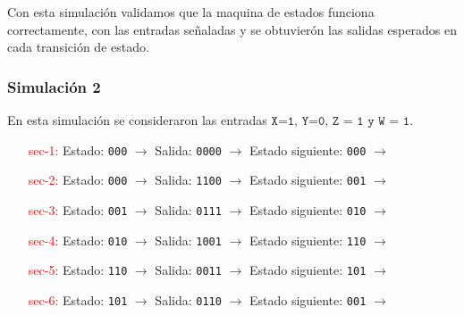\documentclass[12pt, letterpaper]{article}
\begin{document}
Con esta simulación validamos que la maquina de estados funciona correctamente, con las entradas señaladas y se obtuvierón las salidas esperados en cada transición de estado.

\subsubsection*{Simulación 2}

En esta simulación se consideraron las entradas \(\texttt{X=1, Y=0, Z = 1 y W = 1}\).


\begin{enumerate}
    \item[\textcolor{red}{sec-1:}] Estado: \texttt{000} \(\rightarrow\) Salida: \texttt{0000} \(\rightarrow\) Estado siguiente: \texttt{000} \(\rightarrow\)
    \item[\textcolor{red}{sec-2:}] Estado: \texttt{000} \(\rightarrow\) Salida: \texttt{1100} \(\rightarrow\) Estado siguiente: \texttt{001} \(\rightarrow\)
    \item[\textcolor{red}{sec-3:}] Estado: \texttt{001} \(\rightarrow\) Salida: \texttt{0111} \(\rightarrow\) Estado siguiente: \texttt{010} \(\rightarrow\)
    \item[\textcolor{red}{sec-4:}] Estado: \texttt{010} \(\rightarrow\) Salida: \texttt{1001} \(\rightarrow\) Estado siguiente: \texttt{110} \(\rightarrow\)
    \item[\textcolor{red}{sec-5:}] Estado: \texttt{110} \(\rightarrow\) Salida: \texttt{0011} \(\rightarrow\) Estado siguiente: \texttt{101} \(\rightarrow\)
    \item[\textcolor{red}{sec-6:}] Estado: \texttt{101} \(\rightarrow\) Salida: \texttt{0110} \(\rightarrow\) Estado siguiente: \texttt{001} \(\rightarrow\)
\end{enumerate}
\end{document}
